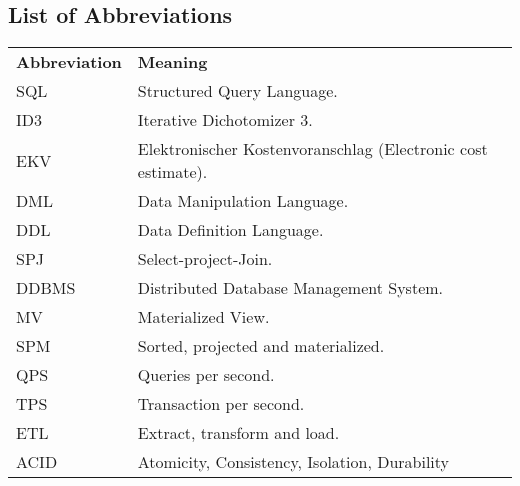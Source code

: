 
% 

\begin{center}
    \section*{List of Abbreviations}
\end{center}

\noindent %
\begin{minipage}{\textwidth}
\begin{tabular}{ll}
    \textbf{Abbreviation} & \textbf{Meaning} \\
    SQL & Structured Query Language. \\
    ID3 & Iterative  Dichotomizer 3. \\
    EKV & Elektronischer Kostenvoranschlag (Electronic cost estimate).\\
    DML & Data Manipulation Language. \\
    DDL & Data Definition Language.\\
    SPJ & Select-project-Join.\\
    DDBMS & Distributed Database Management System.\\
    MV & Materialized View.\\
    SPM & Sorted, projected and materialized.\\
    QPS & Queries per second.\\
    TPS & Transaction per second.\\
    ETL & Extract, transform and load. \\
    ACID & Atomicity, Consistency, Isolation, Durability\\
\end{tabular}
\end{minipage}
% 

    